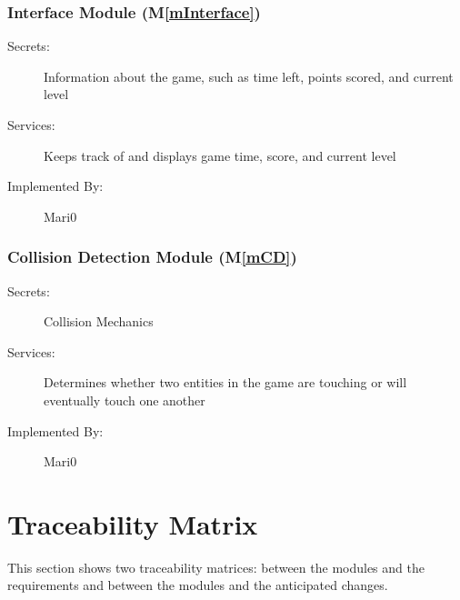 \documentclass[12pt, titlepage]{article}
\newcommand{\mref}[1]{M\ref{#1}}
\begin{document}
\subsubsection{Interface Module (\mref{mInterface})}
\begin{description}
\item[Secrets:]Information about the game, such as time left, points scored, and current level
\item[Services:]Keeps track of and displays game time, score, and current level
\item[Implemented By:] Mari0
\end{description}

\subsubsection{Collision Detection Module (\mref{mCD})}
\begin{description}
\item[Secrets:]Collision Mechanics
\item[Services:]Determines whether two entities in the game are touching or will eventually touch one another
\item[Implemented By:] Mari0
\end{description}

\section{Traceability Matrix} \label{SecTM}

This section shows two traceability matrices: between the modules and the
requirements and between the modules and the anticipated changes.
\end{document}
